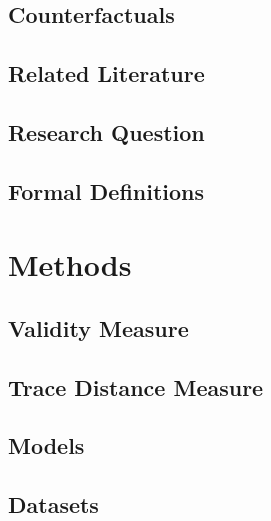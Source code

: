 \documentclass[12pt,a4paper]{report}
\begin{document}
\section{Counterfactuals}
\label{sec:counterfactuals}



\section{Related Literature}
\label{sec:literature}



\section{Research Question}
\label{sec:rq}


\section{Formal Definitions}
\label{sec:formulas}








\chapter{Methods}
\label{sec:methods}

\section{Validity Measure}
\label{sec:validity}


\section{Trace Distance Measure}
\label{sec:distance}


\section{Models}
\label{sec:models}


\section{Datasets}
\label{sec:datasets}

\end{document}
